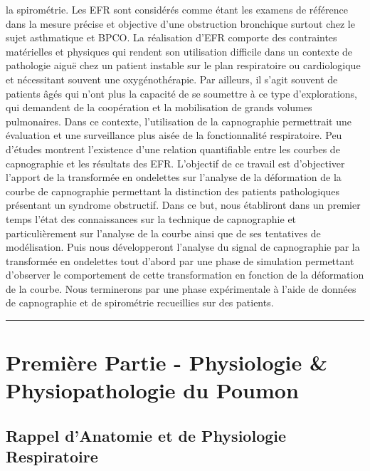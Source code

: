 \documentclass[12pt,]{article}
\begin{document}
la spirométrie. Les EFR sont considérés comme étant les examens de
référence dans la mesure précise et objective d'une obstruction
bronchique surtout chez le sujet asthmatique et BPCO. La réalisation
d'EFR comporte des contraintes matérielles et physiques qui rendent son
utilisation difficile dans un contexte de pathologie aiguë chez un
patient instable sur le plan respiratoire ou cardiologique et
nécessitant souvent une oxygénothérapie. Par ailleurs, il s'agit souvent
de patients âgés qui n'ont plus la capacité de se soumettre à ce type
d'explorations, qui demandent de la coopération et la mobilisation de
grands volumes pulmonaires. Dans ce contexte, l'utilisation de la
capnographie permettrait une évaluation et une surveillance plus aisée
de la fonctionnalité respiratoire. Peu d'études montrent l'existence
d'une relation quantifiable entre les courbes de capnographie et les
résultats des EFR. L'objectif de ce travail est d'objectiver l'apport de
la transformée en ondelettes sur l'analyse de la déformation de la
courbe de capnographie permettant la distinction des patients
pathologiques présentant un syndrome obstructif. Dans ce but, nous
établiront dans un premier temps l'état des connaissances sur la
technique de capnographie et particulièrement sur l'analyse de la courbe
ainsi que de ses tentatives de modélisation. Puis nous développeront
l'analyse du signal de capnographie par la transformée en ondelettes
tout d'abord par une phase de simulation permettant d'observer le
comportement de cette transformation en fonction de la déformation de la
courbe. Nous terminerons par une phase expérimentale à l'aide de données
de capnographie et de spirométrie recueillies sur des patients.

\pagebreak

\begin{center}\rule{0.5\linewidth}{0.5pt}\end{center}

\hypertarget{premiuxe8re-partie---physiologie-physiopathologie-du-poumon}{%
\section{Première Partie - Physiologie \& Physiopathologie du
Poumon}\label{premiuxe8re-partie---physiologie-physiopathologie-du-poumon}}

\hypertarget{rappel-danatomie-et-de-physiologie-respiratoire}{%
\subsection{Rappel d'Anatomie et de Physiologie
Respiratoire}\label{rappel-danatomie-et-de-physiologie-respiratoire}}
\end{document}
